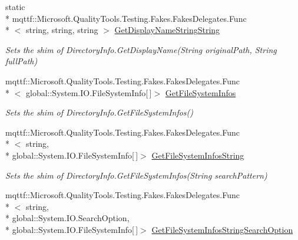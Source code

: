 \begin{DoxyCompactItemize}
static \\*
mqttf\-::\-Microsoft.\-Quality\-Tools.\-Testing.\-Fakes.\-Fakes\-Delegates.\-Func\\*
$<$ string, string, string $>$ \hyperlink{class_system_1_1_i_o_1_1_fakes_1_1_shim_directory_info_af73d2747811ea1a0e33ae0ca20ef2318}{Get\-Display\-Name\-String\-String}
\begin{DoxyCompactList}\small\item\em Sets the shim of Directory\-Info.\-Get\-Display\-Name(\-String original\-Path, String full\-Path)\end{DoxyCompactList}\item 
mqttf\-::\-Microsoft.\-Quality\-Tools.\-Testing.\-Fakes.\-Fakes\-Delegates.\-Func\\*
$<$ global\-::\-System.\-I\-O.\-File\-System\-Info\mbox{[}$\,$\mbox{]}$>$ \hyperlink{class_system_1_1_i_o_1_1_fakes_1_1_shim_directory_info_a77a13060d08de13f8b2d5555cf4f7111}{Get\-File\-System\-Infos}
\begin{DoxyCompactList}\small\item\em Sets the shim of Directory\-Info.\-Get\-File\-System\-Infos()\end{DoxyCompactList}\item 
mqttf\-::\-Microsoft.\-Quality\-Tools.\-Testing.\-Fakes.\-Fakes\-Delegates.\-Func\\*
$<$ string, \\*
global\-::\-System.\-I\-O.\-File\-System\-Info\mbox{[}$\,$\mbox{]}$>$ \hyperlink{class_system_1_1_i_o_1_1_fakes_1_1_shim_directory_info_a29fbc94987a31f97f8d2eabf8ab9fc49}{Get\-File\-System\-Infos\-String}
\begin{DoxyCompactList}\small\item\em Sets the shim of Directory\-Info.\-Get\-File\-System\-Infos(\-String search\-Pattern)\end{DoxyCompactList}\item 
mqttf\-::\-Microsoft.\-Quality\-Tools.\-Testing.\-Fakes.\-Fakes\-Delegates.\-Func\\*
$<$ string, \\*
global\-::\-System.\-I\-O.\-Search\-Option, \\*
global\-::\-System.\-I\-O.\-File\-System\-Info\mbox{[}$\,$\mbox{]}$>$ \hyperlink{class_system_1_1_i_o_1_1_fakes_1_1_shim_directory_info_aa38463c66c3c648735e3f9443be12f13}{Get\-File\-System\-Infos\-String\-Search\-Option}

\end{DoxyCompactItemize}
